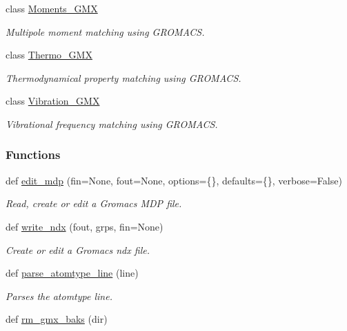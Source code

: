 \begin{DoxyCompactItemize}
\item 
class \hyperlink{classsrc_1_1gmxio_1_1Moments__GMX}{Moments\+\_\+\+G\+MX}
\begin{DoxyCompactList}\small\item\em Multipole moment matching using G\+R\+O\+M\+A\+CS. \end{DoxyCompactList}\item 
class \hyperlink{classsrc_1_1gmxio_1_1Thermo__GMX}{Thermo\+\_\+\+G\+MX}
\begin{DoxyCompactList}\small\item\em Thermodynamical property matching using G\+R\+O\+M\+A\+CS. \end{DoxyCompactList}\item 
class \hyperlink{classsrc_1_1gmxio_1_1Vibration__GMX}{Vibration\+\_\+\+G\+MX}
\begin{DoxyCompactList}\small\item\em Vibrational frequency matching using G\+R\+O\+M\+A\+CS. \end{DoxyCompactList}\end{DoxyCompactItemize}
\subsubsection*{Functions}
\begin{DoxyCompactItemize}
\item 
def \hyperlink{namespacesrc_1_1gmxio_aea51f8e8c67deaad0fccdb8bf633a69c}{edit\+\_\+mdp} (fin=None, fout=None, options=\{\}, defaults=\{\}, verbose=False)
\begin{DoxyCompactList}\small\item\em Read, create or edit a Gromacs M\+DP file. \end{DoxyCompactList}\item 
def \hyperlink{namespacesrc_1_1gmxio_a740586e61712601fc01ab404a40176df}{write\+\_\+ndx} (fout, grps, fin=None)
\begin{DoxyCompactList}\small\item\em Create or edit a Gromacs ndx file. \end{DoxyCompactList}\item 
def \hyperlink{namespacesrc_1_1gmxio_ad77d69866b09dbe5830d9c5f7b48fe84}{parse\+\_\+atomtype\+\_\+line} (line)
\begin{DoxyCompactList}\small\item\em Parses the \textquotesingle{}atomtype\textquotesingle{} line. \end{DoxyCompactList}\item 
def \hyperlink{namespacesrc_1_1gmxio_a7430b70092fa07b4cad7d894a6ade4f9}{rm\+\_\+gmx\+\_\+baks} (dir)
\end{DoxyCompactItemize}
